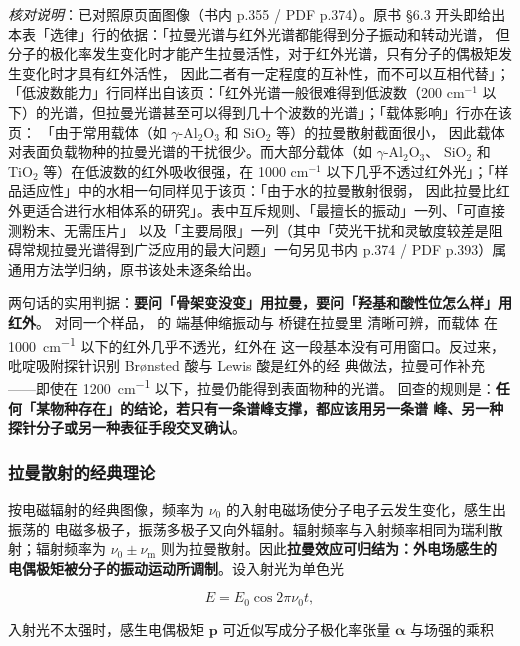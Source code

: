 \emph{核对说明}：已对照原页面图像（书内 p.355 / PDF p.374）。原书 §6.3
开头即给出本表「选律」行的依据：「拉曼光谱与红外光谱都能得到分子振动和转动光谱，
但分子的极化率发生变化时才能产生拉曼活性，对于红外光谱，只有分子的偶极矩发生变化时才具有红外活性，
因此二者有一定程度的互补性，而不可以互相代替」；「低波数能力」行同样出自该页：「红外光谱一般很难得到低波数（200
cm$^{-1}$ 以下）的光谱，但拉曼光谱甚至可以得到几十个波数的光谱」；「载体影响」行亦在该页：
「由于常用载体（如 $\gamma$-Al$_2$O$_3$ 和 SiO$_2$ 等）的拉曼散射截面很小，
因此载体对表面负载物种的拉曼光谱的干扰很少。而大部分载体（如 $\gamma$-Al$_2$O$_3$、
SiO$_2$ 和 TiO$_2$ 等）在低波数的红外吸收很强，在 1000 cm$^{-1}$
以下几乎不透过红外光」；「样品适应性」中的水相一句同样见于该页：「由于水的拉曼散射很弱，
因此拉曼比红外更适合进行水相体系的研究」。表中互斥规则、「最擅长的振动」一列、「可直接测粉末、无需压片」
以及「主要局限」一列（其中「荧光干扰和灵敏度较差是阻碍常规拉曼光谱得到广泛应用的最大问题」一句另见书内 p.374
/ PDF p.393）属通用方法学归纳，原书该处未逐条给出。


\begin{crosscheck}
两句话的实用判据：\textbf{要问「骨架变没变」用拉曼，要问「羟基和酸性位怎么样」用红外}。
对同一个样品， 的  端基伸缩振动与  桥键在拉曼里
清晰可辨，而载体  在 \qty{1000}{cm^{-1}} 以下的红外几乎不透光，红外在
这一段基本没有可用窗口。反过来，吡啶吸附探针识别 Br\o nsted 酸与 Lewis 酸是红外的经
典做法，拉曼可作补充——即使在 \qty{1200}{cm^{-1}} 以下，拉曼仍能得到表面物种的光谱。
回查的规则是：\textbf{任何「某物种存在」的结论，若只有一条谱峰支撑，都应该用另一条谱
峰、另一种探针分子或另一种表征手段交叉确认}。
\end{crosscheck}

\subsubsection{拉曼散射的经典理论}

按电磁辐射的经典图像，频率为 $\nu_0$ 的入射电磁场使分子电子云发生变化，感生出振荡的
电磁多极子，振荡多极子又向外辐射。辐射频率与入射频率相同为瑞利散射；辐射频率为
$\nu_0\pm\nu_{\mathrm{m}}$ 则为拉曼散射。因此\textbf{拉曼效应可归结为：外电场感生的
电偶极矩被分子的振动运动所调制}。设入射光为单色光

\begin{equation}
E=E_0\cos 2\pi\nu_0 t ,
\label{eq:incident-field}
\end{equation}

入射光不太强时，感生电偶极矩 $\mathbf{p}$ 可近似写成分子极化率张量
$\boldsymbol{\alpha}$ 与场强的乘积

